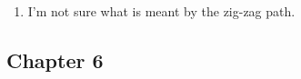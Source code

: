 \documentclass[hidelinks,12pt]{article}
\renewcommand{\leq}{\leqslant}
\newcommand{\R}{\mathbb{R}}
\begin{document}
\begin{enumerate}
\begin{enumerate}[label=(\alph*).]
\begin{proof}
      Now, considering the sequence \(\{x_{n}\}\), with \[
      x_{n+1}=f(x_{n})
      \]
     and \(x_{1}\in\R\). We have \(x_{n+1}-x^{*}=f(x_{n})-f(x^{*})\). Then, by the mean value theorem, there exists some \(\zeta\) such that \(x_{n+1}-x^{*}=f'(\zeta)(x_{n}-x^{*})\). This gives \[
     |x_{n+1}-x^{*}|\leq A|x_{n}-x^{*}|\leq A^{2}|x_{n-1}-x^{*}|\leq\dots
     \]
     And, since \(|A|<1\), this sequence converges to 0, so
     \[
         \{x_{n}\}\to x^{*}
     \]
      \end{proof} 
  \item I'm not sure what is meant by the zig-zag path.
        \end{enumerate}
\end{enumerate}
\subsection*{Chapter 6}
\end{document}
